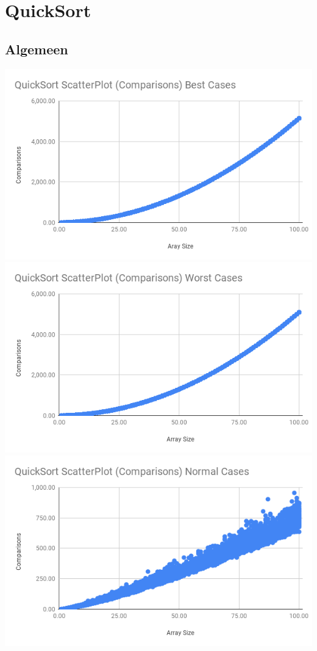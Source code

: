 \section{QuickSort}

\subsection{Algemeen}

\includegraphics[scale=0.3]{sections/media/QS_C_BC}
\includegraphics[scale=0.3]{sections/media/QS_C_WC}
\includegraphics[scale=0.6]{sections/media/QS_C_NC}


